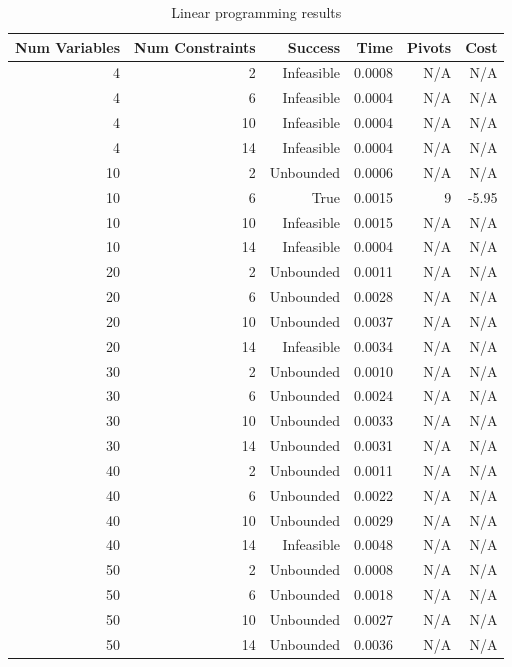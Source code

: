 \begin{table}[ht]
    \centering
    \begin{tabular}{rrrrrr}
        \toprule
        Num Variables & Num Constraints & Success & Time & Pivots & Cost \\
        \midrule
        4 & 2 & Infeasible & 0.0008 & N/A & N/A \\
		4 & 6 & Infeasible & 0.0004 & N/A & N/A \\
		4 & 10 & Infeasible & 0.0004 & N/A & N/A \\
		4 & 14 & Infeasible & 0.0004 & N/A & N/A \\
		10 & 2 & Unbounded & 0.0006 & N/A & N/A \\
		10 & 6 & True & 0.0015 & 9 & -5.95 \\
		10 & 10 & Infeasible & 0.0015 & N/A & N/A \\
		10 & 14 & Infeasible & 0.0004 & N/A & N/A \\
		20 & 2 & Unbounded & 0.0011 & N/A & N/A \\
		20 & 6 & Unbounded & 0.0028 & N/A & N/A \\
		20 & 10 & Unbounded & 0.0037 & N/A & N/A \\
		20 & 14 & Infeasible & 0.0034 & N/A & N/A \\
		30 & 2 & Unbounded & 0.0010 & N/A & N/A \\
		30 & 6 & Unbounded & 0.0024 & N/A & N/A \\
		30 & 10 & Unbounded & 0.0033 & N/A & N/A \\
		30 & 14 & Unbounded & 0.0031 & N/A & N/A \\
		40 & 2 & Unbounded & 0.0011 & N/A & N/A \\
		40 & 6 & Unbounded & 0.0022 & N/A & N/A \\
		40 & 10 & Unbounded & 0.0029 & N/A & N/A \\
		40 & 14 & Infeasible & 0.0048 & N/A & N/A \\
		50 & 2 & Unbounded & 0.0008 & N/A & N/A \\
		50 & 6 & Unbounded & 0.0018 & N/A & N/A \\
		50 & 10 & Unbounded & 0.0027 & N/A & N/A \\
		50 & 14 & Unbounded & 0.0036 & N/A & N/A \\
        \bottomrule
    \end{tabular}
    \caption{Linear programming results}
    \label{tab:lp-results}
\end{table}